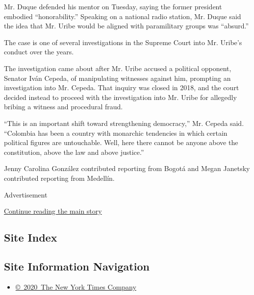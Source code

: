 Mr. Duque defended his mentor on Tuesday, saying the former president
embodied ``honorability.'' Speaking on a national radio station, Mr.
Duque said the idea that Mr. Uribe would be aligned with paramilitary
groups was ``absurd.''

The case is one of several investigations in the Supreme Court into Mr.
Uribe's conduct over the years.

The investigation came about after Mr. Uribe accused a political
opponent, Senator Iván Cepeda, of manipulating witnesses against him,
prompting an investigation into Mr. Cepeda. That inquiry was closed in
2018, and the court decided instead to proceed with the investigation
into Mr. Uribe for allegedly bribing a witness and procedural fraud.

``This is an important shift toward strengthening democracy,'' Mr.
Cepeda said. ``Colombia has been a country with monarchic tendencies in
which certain political figures are untouchable. Well, here there cannot
be anyone above the constitution, above the law and above justice.''

Jenny Carolina González contributed reporting from Bogotá and Megan
Janetsky contributed reporting from Medellín.

Advertisement

\protect\hyperlink{after-bottom}{Continue reading the main story}

\hypertarget{site-index}{%
\subsection{Site Index}\label{site-index}}

\hypertarget{site-information-navigation}{%
\subsection{Site Information
Navigation}\label{site-information-navigation}}

\begin{itemize}
\tightlist
\item
  \href{https://help.nytimes3xbfgragh.onion/hc/en-us/articles/115014792127-Copyright-notice}{©~2020~The
  New York Times Company}
\end{itemize}

